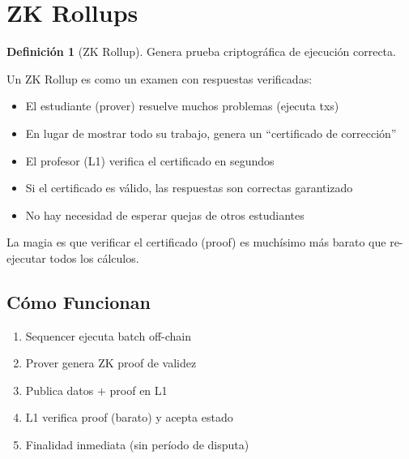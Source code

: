 \documentclass[11pt,a4paper,twoside,openright]{book}
\theoremstyle{definition}
\newtheorem{definition}{Definición}[chapter]
\theoremstyle{plain}
\theoremstyle{remark}
\begin{document}

\section{ZK Rollups}

\begin{definition}[ZK Rollup]
Genera prueba criptográfica de ejecución correcta.
\end{definition}

\begin{intuicion}
Un ZK Rollup es como un examen con respuestas verificadas:
\begin{itemize}
    \item El estudiante (prover) resuelve muchos problemas (ejecuta txs)
    \item En lugar de mostrar todo su trabajo, genera un ``certificado de corrección''
    \item El profesor (L1) verifica el certificado en segundos
    \item Si el certificado es válido, las respuestas son correctas garantizado
    \item No hay necesidad de esperar quejas de otros estudiantes
\end{itemize}

La magia es que verificar el certificado (proof) es muchísimo más barato que re-ejecutar todos los cálculos.
\end{intuicion}

\subsection{Cómo Funcionan}

\begin{enumerate}
    \item Sequencer ejecuta batch off-chain
    \item Prover genera ZK proof de validez
    \item Publica datos + proof en L1
    \item L1 verifica proof (barato) y acepta estado
    \item Finalidad inmediata (sin período de disputa)
\end{enumerate}
\end{document}
